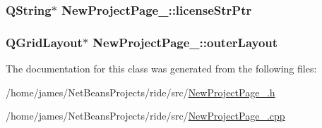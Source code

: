 \hypertarget{class_new_project_page__3_aa571b8638ba533ee7e6bee7c476d259e}{
\subsubsection[{license\-Str\-Ptr}]{\setlength{\rightskip}{0pt plus 5cm}Q\-String$\ast$ New\-Project\-Page\-\_\-::license\-Str\-Ptr\hspace{0.3cm}{\ttfamily [private]}}}\label{class_new_project_page__3_aa571b8638ba533ee7e6bee7c476d259e}
\hypertarget{class_new_project_page__3_ade0fb5d0c05524c44f8b411150533757}{
\subsubsection[{outer\-Layout}]{\setlength{\rightskip}{0pt plus 5cm}Q\-Grid\-Layout$\ast$ New\-Project\-Page\-\_\-::outer\-Layout\hspace{0.3cm}{\ttfamily [private]}}}\label{class_new_project_page__3_ade0fb5d0c05524c44f8b411150533757}


The documentation for this class was generated from the following files\-:\begin{DoxyCompactItemize}
\item 
/home/james/\-Net\-Beans\-Projects/ride/src/\hyperlink{_new_project_page__3_8h}{New\-Project\-Page\-\_.\-h}\item 
/home/james/\-Net\-Beans\-Projects/ride/src/\hyperlink{_new_project_page__3_8cpp}{New\-Project\-Page\-\_.\-cpp}\end{DoxyCompactItemize}
